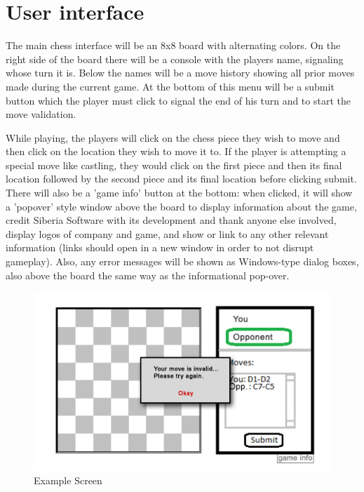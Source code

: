 \section{User interface}

The main chess interface will be an 8x8 board with alternating colors. On the right side of the board there will 
be a console with the players name, signaling whose turn it is. Below the names will be a move history showing all prior moves made during the current game. At the bottom of this menu will be a submit button which the player must
click to signal the end of his turn and to start the move validation.

While playing, the players will click on the chess piece they wish to move and then click on the location they wish to move it to. If the player is attempting a special move like castling, they would click on the first piece and then its final location followed by the second piece and its final location before clicking submit. There will also be a 'game info' button at the bottom: when clicked, it will show a 'popover' style window above the board to display information about the game, credit Siberia Software with its development and thank anyone else involved, display logos of company and game, and show or link to any other relevant information (links should open in a new window in order to not disrupt gameplay). Also, any error messages will be shown as Windows-type dialog boxes, also above the board the same way as the informational pop-over.
\begin{figure}[H]
   \centering
   \includegraphics[scale=1.0]{screenshot7.jpg}
   \caption{Example Screen}
  \end{figure}

